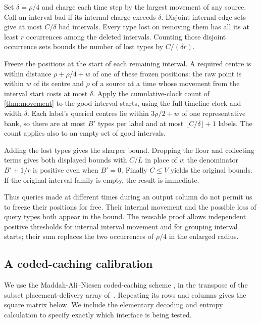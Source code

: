 \begin{outline}
Set $\delta=\rho/4$ and charge each time step by the largest movement of
any source.  Call an interval bad if its internal charge exceeds $\delta$.
Disjoint internal edge sets give at most $C/\delta$ bad intervals.
Every type lost on removing them has all its at least $r$ occurrences
among the deleted intervals.  Counting those disjoint occurrence sets
bounds the number of lost types by $C/(\delta r)$.

Freeze the positions at the start of each remaining interval.  A
required centre is within distance $\rho+\rho/4+w$ of one of these
frozen positions: the raw point is within $w$ of its centre and $\rho$
of a source at a time whose movement from the interval start costs at
most $\delta$.  Apply the cumulative-clock count of \cref{thm:movement}
to the good interval starts, using the full timeline clock and width
$\delta$.  Each label's queried centres lie within $3\rho/2+w$ of
one representative bank, so there are at most $B'$ types per label and
at most $\lfloor C/\delta\rfloor+1$ labels.  The count applies also to
an empty set of good intervals.

Adding the lost types gives the sharper bound.  Dropping the floor and
collecting terms gives both displayed bounds with $C/L$ in place of
$v$; the denominator $B'+1/r$ is positive even when $B'=0$.
Finally $C\le V$ yields the original bounds.  If the original interval
family is empty, the result is immediate.
\end{outline}

Thus queries made at different times during an output column do not
permit us to freeze their positions for free.  Their internal movement
and the possible loss of query types both appear in the bound.
The reusable proof allows independent positive thresholds for internal
interval movement and for grouping interval starts; their sum replaces
the two occurrences of $\rho/4$ in the enlarged radius.

\subsection{A coded-caching calibration}

We use the Maddah-Ali--Niesen coded-caching scheme
\cite[Section V]{MaddahAliNiesen2014}, in the transpose of the subset
placement-delivery array of~\cite[Section IV, Theorem 2]{YanChengTangChen2017}.
Repeating its rows
and columns gives the square matrix below.  We include the elementary
decoding and entropy calculation to specify exactly which interface is
being tested.

